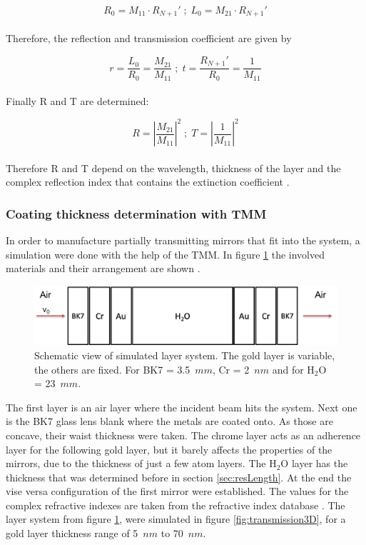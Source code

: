 \begin{equation}
R_0 = M_{11} \cdot R_{N+1}' \; ; \; L_0 = M_{21} \cdot R_{N+1}'
\end{equation}
\\
Therefore, the reflection and transmission coefficient are given by

\begin{equation}
r = \frac{L_0}{R_0} = \frac{M_{21}}{M_{11}} \; ; \;
t = \frac{R_{N+1}'}{R_0} = \frac{1}{M_{11}} 
\label{eq:rtCoef}
\end{equation}
\\
Finally R and T are determined:

\begin{equation}
R = \left\lvert \frac{M_{21}}{M_{11}}\right\rvert^2 \; ; \;
T = \left\lvert \frac{1}{M_{11}}\right\rvert^2
\label{eq:RT}
\end{equation}
\\
Therefore R and T depend on the wavelength, thickness of the layer and the complex reflection index that contains the extinction coefficient \cite{Podgorsek:Vielfachschichten}.

\subsubsection{Coating thickness determination with TMM}

In order to manufacture partially transmitting mirrors that fit into the system, a simulation were done with the help of the TMM. In figure \ref{fig:TMMsimLayersystem} the involved materials and their arrangement are shown . 

\begin{figure}[H]
	\centering
	\includegraphics[height=0.15\textheight,width=\textwidth]{05_OUSD/images/TMM_schematisch.png}
	\caption{Schematic view of simulated layer system. The gold layer is variable, the others are fixed. For BK7 = 3.5~$mm$, Cr = 2~$nm$ and for H$_2$O = 23~$mm$.}
	\label{fig:TMMsimLayersystem}
\end{figure} 

The first layer is an air layer where the incident beam hits the system. Next one is the BK7 glass lens blank where the metals are coated onto. As those are concave, their waist thickness were taken. The chrome layer acts as an adherence layer for the following gold layer, but it barely affects the properties of the mirrors, due to the thickness of just a few atom layers. The H$_2$O layer has the thickness that was determined before in section \ref{sec:resLength}. At the end the vise versa configuration of the first mirror were established. The values for the complex refractive indexes are taken from the refractive index database \cite{rii}. The layer system from figure \ref{fig:TMMsimLayersystem}, were simulated in figure \ref{fig:transmission3D}, for a gold layer thickness range of 5~$nm$ to 70~$nm$.

